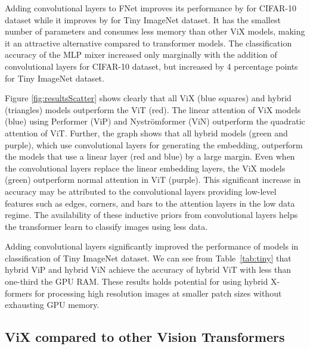 \documentclass{article}
\begin{document}
Adding convolutional layers to FNet improves its performance by  for CIFAR-10 dataset while it improves by  for Tiny ImageNet dataset. It has the smallest number of parameters and consumes less memory than other ViX models, making it an attractive alternative compared to transformer models. The classification accuracy of the MLP mixer increased only marginally with the addition of convolutional layers for CIFAR-10 dataset, but increased by 4 percentage points for Tiny ImageNet dataset. 



Figure \ref{fig:resultsScatter} shows clearly that all ViX (blue squares) and hybrid (triangles) models outperform the ViT (red). The linear attention of ViX models (blue) using Performer (ViP) and Nyströmformer (ViN) outperform the quadratic attention of ViT. Further, the graph shows that all hybrid models (green and purple), which use convolutional layers for generating the embedding, outperform the models that use a linear layer (red and blue) by a large margin. Even when the convolutional layers replace the linear embedding layers, the ViX models (green) outperform normal attention in ViT (purple). This significant increase in accuracy may be attributed to the convolutional layers providing low-level features such as edges, corners, and bars to the attention layers in the low data regime. The availability of these inductive priors from convolutional layers helps the transformer learn to classify images using less data. 





Adding convolutional layers significantly improved the performance of models in classification of Tiny ImageNet dataset. We can see from Table~\ref{tab:tiny} that hybrid ViP and hybrid ViN achieve the accuracy of hybrid ViT with less than one-third the GPU RAM. These results holds potential for using hybrid X-formers for processing high resolution images at smaller patch sizes without exhausting GPU memory. 



\subsection{ViX compared to other Vision Transformers}
\end{document}
